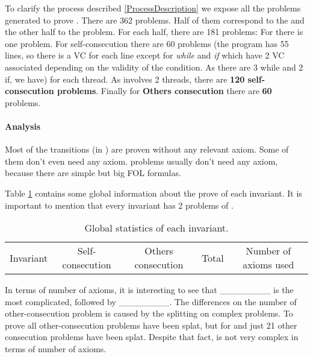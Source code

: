 To clarify the process described  \ref{ProcessDescription} we expose all the \spass problems generated to prove \invDisjoint.
%
There are 362 \spass problems. Half of them correspond to the \reducedProblem and the other half to the \smallToBig problem.
%
For each half, there are 181 \spass problems:
%
For \textbf{\instantiation} there is one problem. 
%
For self-consecution there are 60 \spass problems (the program has 55 lines, so there is a \gls{VC} for each line except for \textit{while} and \textit{if} which have 2 \gls{VC} associated depending on the validity of the condition. As there are 3 while and 2 if, we have) for each thread. 
%
As \invDisjoint involves 2 threads, there are \textbf{120 self-consecution \spass problems}.
%
Finally for \textbf{Others consecution} there are \textbf{60} \spass problems.

\paragraph{Analysis}

Most of the transitions (\numTransitionsProvedWithPC in \numTotalTransitions) are proven without any relevant axiom. 
%
Some of them don't even need any axiom. 
%
\smallToBig problems usually don't need any axiom, because there are simple but big \gls{FOL} formulas.

Table \ref{table:analysisProofs}  contains some global information about the prove of each invariant.
%
It is important to mention that every invariant has 2 problems of \instantiation. 

\begin{table}[hbtp]
\centering
\begin{tabular}{ccccc}
Invariant & Self-consecution & Others consecution & Total & Number of axioms used\\

\end{tabular}
\label{table:analysisProofs}
\caption{Global statistics of each invariant.}
\end{table}


In terms of number of axioms, it is interesting to see that \_\_\_\_\_\_\_\_ is the most complicated, followed by \_\_\_\_\_\_\_\_. 
%
The differences on the number of other-consecution problem is caused by the splitting on complex \spass problems. 
%
To prove \invOrder all other-consecution problems have been splat, but for \invLock and \invNext just 21 other consecution problems have been splat.
%
Despite that fact, \invOrder is not very complex in terms of number of axioms. 


